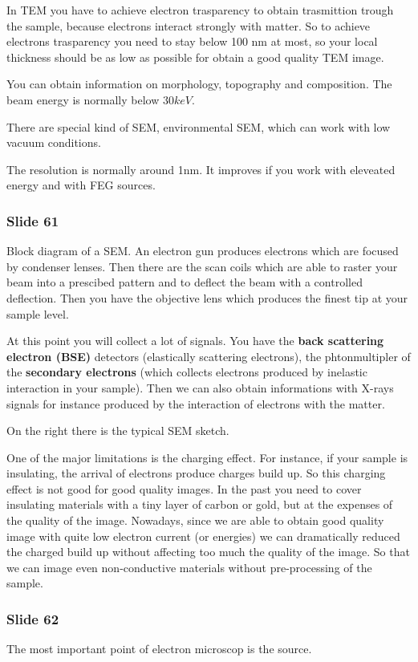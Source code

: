 \documentclass[../main/main.tex]{subfiles}
\begin{document}
In TEM you have to achieve electron trasparency to obtain trasmittion trough the sample, because electrons interact strongly with matter. So to achieve electrons trasparency you need to stay below 100 nm at most, so your local thickness should be as low as possible for obtain a good quality TEM image.


You can obtain information on morphology, topography and composition. The beam energy is normally below \( 30keV \).

There are special kind of SEM, environmental SEM, which can work with low vacuum conditions.

The resolution is normally around 1nm. It improves if you work with eleveated energy and with FEG sources.

\subsubsection{Slide 61}
Block diagram of a SEM.
An electron gun produces electrons which are focused by condenser lenses. Then there are the scan coils which are able to raster your beam into a prescibed pattern and to deflect the beam with a controlled deflection. Then you have the objective lens which produces the finest tip  at your sample level.

At this point you will collect a lot of signals. You have the \textbf{back scattering electron (BSE)} detectors (elastically scattering electrons), the phtonmultipler of the \textbf{secondary electrons} (which collects electrons produced by inelastic interaction in your sample). Then we can also obtain informations with X-rays signals for instance produced by the interaction of electrons with the matter.

On the right there is the typical SEM sketch.

One of the major limitations is the charging effect. For instance, if your sample is insulating, the arrival of electrons produce charges build up. So this charging effect is not good for good quality images. In the past you need to cover insulating materials with a tiny layer of carbon or gold, but at the expenses of the quality of the image.
Nowadays, since we are able to obtain good quality image with quite low electron current (or energies) we can dramatically reduced the charged build up without affecting too much the quality of the image. So that we can image even non-conductive materials without pre-processing of the sample.



\subsubsection{Slide 62}
The most important point of electron microscop is the source.
\end{document}
